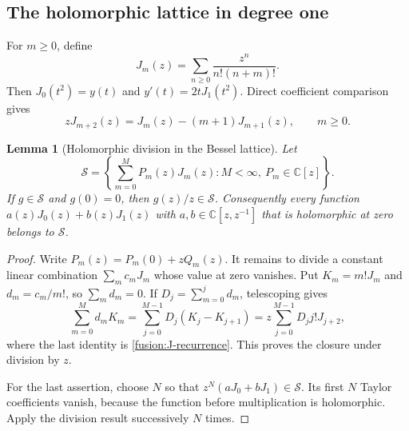 \documentclass[11pt,a4paper]{article}
\newtheorem{lemma}[theorem]{Lemma}
\theoremstyle{definition}
\theoremstyle{remark}
\numberwithin{equation}{section}
\begin{document}
\subsection{The holomorphic lattice in degree one}

For $m\ge0$, define
\[
 J_m(z)=\sum_{n\ge0}\frac{z^n}{n!(n+m)!}.
\]
Then $J_0(t^2)=y(t)$ and $y'(t)=2tJ_1(t^2)$.
Direct coefficient comparison gives
\begin{equation}\label{fusion:J-recurrence}
 zJ_{m+2}(z)=J_m(z)-(m+1)J_{m+1}(z),\qquad m\ge0.
\end{equation}

\begin{lemma}[Holomorphic division in the Bessel lattice]
\label{fusion:holomorphic-lattice}
Let
\[
 \mathcal S=\left\{\sum_{m=0}^{M}P_m(z)J_m(z):
 M<\infty,\ P_m\in\mathbb C[z]\right\}.
\]
If $g\in\mathcal S$ and $g(0)=0$, then $g(z)/z\in\mathcal S$.
Consequently every function
$a(z)J_0(z)+b(z)J_1(z)$ with
$a,b\in\mathbb C[z,z^{-1}]$ that is holomorphic at zero
belongs to $\mathcal S$.
\end{lemma}
\begin{proof}
Write $P_m(z)=P_m(0)+zQ_m(z)$.  It remains to divide a
constant linear combination $\sum_m c_mJ_m$ whose value at
zero vanishes.  Put $K_m=m!J_m$ and $d_m=c_m/m!$, so
$\sum_md_m=0$.  If $D_j=\sum_{m=0}^{j}d_m$, telescoping gives
\[
 \sum_{m=0}^{M}d_mK_m
 =\sum_{j=0}^{M-1}D_j(K_j-K_{j+1})
 =z\sum_{j=0}^{M-1}D_jj!J_{j+2},
\]
where the last identity is \eqref{fusion:J-recurrence}.
This proves the closure under division by $z$.

For the last assertion, choose $N$ so that
$z^N(aJ_0+bJ_1)\in\mathcal S$.  Its first $N$ Taylor
coefficients vanish, because the function before multiplication
is holomorphic.  Apply the division result successively $N$
times.
\end{proof}
\end{document}
